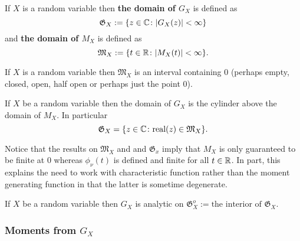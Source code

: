 \begin{shaded}



\begin{definition}
If $X$ is a random variable then {\bf the domain of $G_X$} is defined as
\[
\mathfrak G_{X}:=\{z\in \Bbb C\colon |G_X(z)|<\infty \}
\]
and {\bf the domain of $M_X$} is defined as
\[
\mathfrak M_{X}:=\{t\in \Bbb R\colon |M_X(t)|<\infty \}.
\]
\end{definition}


\begin{theorem}
If $X$ is a random variable then $\mathfrak M_{X}$ is an interval containing $0$ (perhaps empty, closed,  open, half open or perhaps just the point $0$).
\end{theorem}



\begin{theorem}
If $X$ be a random variable then the domain of $G_X$ is the cylinder above the domain of $M_X$. In particular
\[
\mathfrak G_{X} = \{z\in \Bbb C\colon \text{real}(z)\in \mathfrak M_{X}  \}.
\]
\end{theorem}


Notice that the results on $\mathfrak M_X$ and and $\mathfrak G_x$  imply that $M_X$ is only guaranteed to be finite at $0$ whereas $\phi_\nu(t)$ is defined and finite for all $t\in \Bbb R$. In part, this explains the need to work with characteristic function rather than the moment generating function in that the latter is sometime degenerate.


\begin{theorem}
If $X$ be a random variable then $G_X$ is analytic on $\mathfrak G_{X}^o:= \text{the interior of $\mathfrak G_{X}$}$.
\end{theorem}




\subsubsection{Moments from $G_X$ }






\end{shaded}
